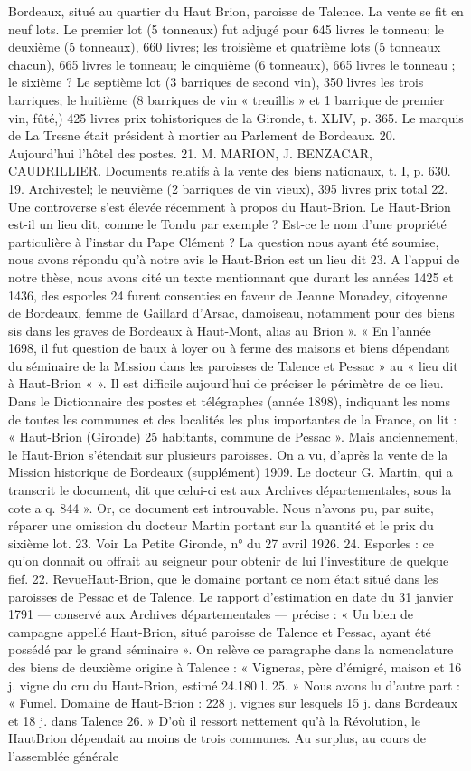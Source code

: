 Bordeaux, situé au quartier du Haut Brion, paroisse de Talence. La vente se fit en neuf lots. Le premier lot (5 tonneaux) fut adjugé pour 645 livres le tonneau; le deuxième (5 tonneaux), 660 livres; les troisième et quatrième lots (5 tonneaux chacun), 665 livres le tonneau; le cinquième (6 tonneaux), 665 livres le tonneau ; le sixième ? Le septième lot (3 barriques de second vin), 350 livres les trois barriques; le huitième (8 barriques de vin « treuillis » et 1 barrique de premier vin, fûté,) 425 livres prix tohistoriques de la Gironde, t. XLIV, p. 365. Le marquis de La Tresne était président à mortier au Parlement de Bordeaux. 20. Aujourd'hui l'hôtel des postes. 21. M. MARION, J. BENZACAR, CAUDRILLIER. Documents relatifs à la vente des biens nationaux, t. I, p. 630. 19. Archivestel; le neuvième (2 barriques de vin vieux), 395 livres prix total 22. Une controverse s'est élevée récemment à propos du Haut-Brion. Le Haut-Brion est-il un lieu dit, comme le Tondu par exemple ? Est-ce le nom d'une propriété particulière à l'instar du Pape Clément ? La question nous ayant été soumise, nous avons répondu qu'à notre avis le Haut-Brion est un lieu dit 23. A l'appui de notre thèse, nous avons cité un texte mentionnant que durant les années 1425 et 1436, des esporles 24 furent consenties en faveur de Jeanne Monadey, citoyenne de Bordeaux, femme de Gaillard d'Arsac, damoiseau, notamment pour des biens sis dans les graves de Bordeaux à Haut-Mont, alias au Brion ». « En l'année 1698, il fut question de baux à loyer ou à ferme des maisons et biens dépendant du séminaire de la Mission dans les paroisses de Talence et Pessac » au « lieu dit à Haut-Brion « ». Il est difficile aujourd'hui de préciser le périmètre de ce lieu. Dans le Dictionnaire des postes et télégraphes (année 1898), indiquant les noms de toutes les communes et des localités les plus importantes de la France, on lit : « Haut-Brion (Gironde) 25 habitants, commune de Pessac ». Mais anciennement, le Haut-Brion s'étendait sur plusieurs paroisses. On a vu, d'après la vente de la Mission historique de Bordeaux (supplément) 1909. Le docteur G. Martin, qui a transcrit le document, dit que celui-ci est aux Archives départementales, sous la cote a q. 844 ». Or, ce document est introuvable. Nous n'avons pu, par suite, réparer une omission du docteur Martin portant sur la quantité et le prix du sixième lot. 23. Voir La Petite Gironde, n° du 27 avril 1926. 24. Esporles : ce qu'on donnait ou offrait au seigneur pour obtenir de lui l'investiture de quelque fief. 22. RevueHaut-Brion, que le domaine portant ce nom était situé dans les paroisses de Pessac et de Talence. Le rapport d'estimation en date du 31 janvier 1791 — conservé aux Archives départementales — précise : « Un bien de campagne appellé Haut-Brion, situé paroisse de Talence et Pessac, ayant été possédé par le grand séminaire ». On relève ce paragraphe dans la nomenclature des biens de deuxième origine à Talence : « Vigneras, père d'émigré, maison et 16 j. vigne du cru du Haut-Brion, estimé 24.180 l. 25. » Nous avons lu d'autre part : « Fumel. Domaine de Haut-Brion : 228 j. vignes sur lesquels 15 j. dans Bordeaux et 18 j. dans Talence 26. » D'où il ressort nettement qu'à la Révolution, le HautBrion dépendait au moins de trois communes. Au surplus, au cours de l'assemblée générale 